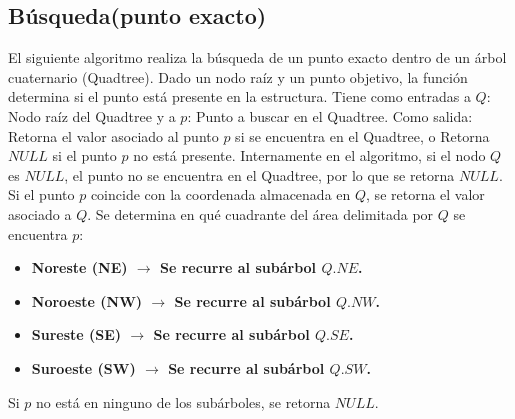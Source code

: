 \documentclass[9pt,a4paper,twoside]{rho-class/rho}
\begin{document}
            
        \subsection{Búsqueda(punto exacto)}
            El siguiente algoritmo realiza la búsqueda de un punto exacto dentro de un árbol cuaternario (Quadtree). Dado un nodo raíz y un punto objetivo, la función determina si el punto está presente en la estructura. Tiene como entradas a $Q$: Nodo raíz del Quadtree y a $p$: Punto a buscar en el Quadtree. Como salida: Retorna el valor asociado al punto $p$ si se encuentra en el Quadtree, o Retorna $NULL$ si el punto $p$ no está presente.
            Internamente en el algoritmo, si el nodo $Q$ es $NULL$, el punto no se encuentra en el Quadtree, por lo que se retorna $NULL$. Si el punto $p$ coincide con la coordenada almacenada en $Q$, se retorna el valor asociado a $Q$. Se determina en qué cuadrante del área delimitada por $Q$ se encuentra $p$: \cite{samet_spatial_structures}
            \begin{itemize}
                \item \textbf{Noreste (NE) $\rightarrow$ Se recurre al subárbol $Q.NE$.}
                \item \textbf{Noroeste (NW) $\rightarrow$ Se recurre al subárbol $Q.NW$.}
                \item \textbf{Sureste (SE) $\rightarrow$ Se recurre al subárbol $Q.SE$.}
                \item \textbf{Suroeste (SW) $\rightarrow$ Se recurre al subárbol $Q.SW$.}
            \end{itemize}
            Si $p$ no está en ninguno de los subárboles, se retorna $NULL$.
\end{document}
